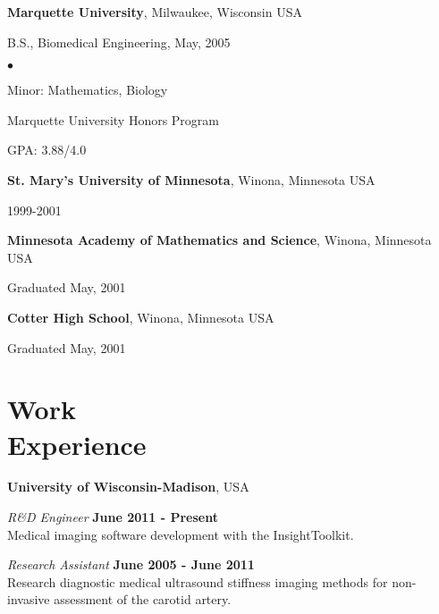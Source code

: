 \documentclass[margin,line]{res}
\newenvironment{list1}{
  \begin{list}{\ding{113}}{%
      \setlength{\itemsep}{0in}
      \setlength{\parsep}{0in} \setlength{\parskip}{0in}
      \setlength{\topsep}{0in} \setlength{\partopsep}{0in} 
      \setlength{\leftmargin}{0.17in}}}{\end{list}}
\newenvironment{list2}{
  \begin{list}{$\bullet$}{%
      \setlength{\itemsep}{0in}
      \setlength{\parsep}{0in} \setlength{\parskip}{0in}
      \setlength{\topsep}{0in} \setlength{\partopsep}{0in} 
      \setlength{\leftmargin}{0.2in}}}{\end{list}}
\begin{document}
\begin{resume}
{\bf Marquette University}, Milwaukee, Wisconsin USA\\
\vspace*{-.1in}
\begin{list1}
\item[] B.S., Biomedical Engineering,  May, 2005

\begin{list2}
 \vspace*{.05in}
 \item Minor: Mathematics, Biology
 \item Marquette University Honors Program
 \item GPA: 3.88/4.0
\end{list2}
\end{list1}

{\bf St. Mary's University of Minnesota}, Winona, Minnesota USA\\
\vspace*{-.1in}
\begin{list1}
\item[] 1999-2001
\end{list1}


{\bf Minnesota Academy of Mathematics and Science}, Winona, Minnesota USA\\
\vspace*{-.1in}
\begin{list1}
\item[] Graduated May, 2001
\end{list1}

{\bf Cotter High School}, Winona, Minnesota USA\\
\vspace*{-.1in}
\begin{list1}
\item[] Graduated May, 2001
\end{list1}

\section{\sc Work\\ Experience}

{\bf University of Wisconsin-Madison}, USA

\vspace{-.3cm}
{\em R\&D Engineer} \hfill {\bf June 2011 - Present} \\
Medical imaging software development with the InsightToolkit.

\vspace{-.3cm}
{\em Research Assistant} \hfill {\bf June 2005 - June 2011} \\
Research diagnostic medical ultrasound stiffness imaging methods for non-invasive assessment of the carotid artery.


\end{resume}
\end{document}
